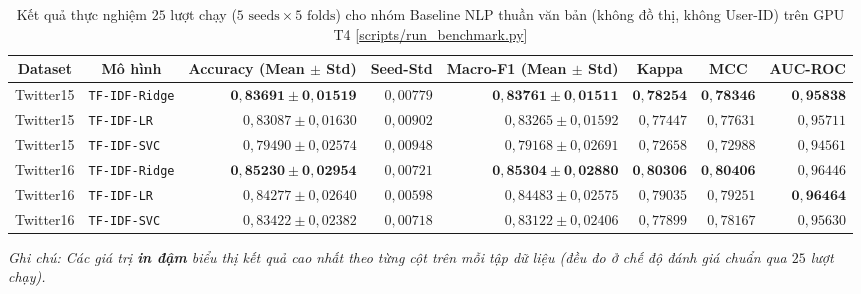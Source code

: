 \documentclass[11pt,a4paper]{extreport}
\newcommand{\ghrepo}{https://github.com/pqui-345/BiGCN-Plus-Rumor-Detection/blob/main}
\newcommand{\coderef}[2]{\textnormal{[\href{\ghrepo/#1}{#2}]}}
\begin{document}
\begin{table}[htbp]
    \centering
    \caption[Kết quả 25 lượt của nhóm Baseline NLP thuần văn bản]{Kết quả thực nghiệm $25$ lượt chạy ($5\text{ seeds} \times 5\text{ folds}$) cho nhóm Baseline NLP thuần văn bản (không đồ thị, không User-ID) trên GPU T4 \coderef{scripts/run_benchmark.py}{scripts/run\_benchmark.py}}
    \label{tab:nlp-multiseed}
    \footnotesize
    \setlength{\tabcolsep}{4pt}
    \begin{tabular}{@{}llrrrrrr@{}}
        \toprule
        \multicolumn{1}{c}{\textbf{Dataset}} & \multicolumn{1}{c}{\textbf{Mô hình}} & \multicolumn{1}{c}{\textbf{Accuracy (Mean $\pm$ Std)}} & \multicolumn{1}{c}{\textbf{Seed-Std}} & \multicolumn{1}{c}{\textbf{Macro-F1 (Mean $\pm$ Std)}} & \multicolumn{1}{c}{\textbf{Kappa}} & \multicolumn{1}{c}{\textbf{MCC}} & \multicolumn{1}{c}{\textbf{AUC-ROC}} \\
        \midrule
        Twitter15 & \texttt{TF-IDF-Ridge} & $\mathbf{0{,}83691 \pm 0{,}01519}$ & $0{,}00779$ & $\mathbf{0{,}83761 \pm 0{,}01511}$ & $\mathbf{0{,}78254}$ & $\mathbf{0{,}78346}$ & $\mathbf{0{,}95838}$ \\
        Twitter15 & \texttt{TF-IDF-LR}    & $0{,}83087 \pm 0{,}01630$ & $0{,}00902$ & $0{,}83265 \pm 0{,}01592$ & $0{,}77447$ & $0{,}77631$ & $0{,}95711$ \\
        Twitter15 & \texttt{TF-IDF-SVC}   & $0{,}79490 \pm 0{,}02574$ & $0{,}00948$ & $0{,}79168 \pm 0{,}02691$ & $0{,}72658$ & $0{,}72988$ & $0{,}94561$ \\
        \addlinespace[4pt]
        Twitter16 & \texttt{TF-IDF-Ridge} & $\mathbf{0{,}85230 \pm 0{,}02954}$ & $0{,}00721$ & $\mathbf{0{,}85304 \pm 0{,}02880}$ & $\mathbf{0{,}80306}$ & $\mathbf{0{,}80406}$ & $0{,}96446$ \\
        Twitter16 & \texttt{TF-IDF-LR}    & $0{,}84277 \pm 0{,}02640$ & $0{,}00598$ & $0{,}84483 \pm 0{,}02575$ & $0{,}79035$ & $0{,}79251$ & $\mathbf{0{,}96464}$ \\
        Twitter16 & \texttt{TF-IDF-SVC}   & $0{,}83422 \pm 0{,}02382$ & $0{,}00718$ & $0{,}83122 \pm 0{,}02406$ & $0{,}77899$ & $0{,}78167$ & $0{,}95630$ \\
        \bottomrule
    \end{tabular}
    \par\vspace{3pt}
    {\footnotesize\textit{Ghi chú: Các giá trị \textbf{in đậm} biểu thị kết quả cao nhất theo từng cột trên mỗi tập dữ liệu (đều đo ở chế độ đánh giá chuẩn qua $25$ lượt chạy).}}
\end{table}
\end{document}
